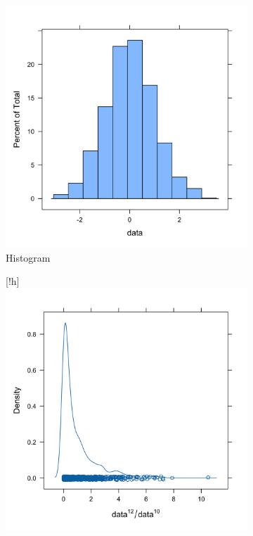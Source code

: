 \documentclass[10pt, a4paper, titlepage]{article}
\begin{document}
\begin{figure}[htbp]
    \centering
    \begin{subfigure}{0.45\textwidth}
        \centering
        \includegraphics[width=\textwidth]{histogram.png}
        \caption{Histogram}
        \label{fig:sub1}
    \end{subfigure}
    \hfill
    \begin{subfigure}{0.45\textwidth}[!h]
        \centering
        \includegraphics[width=\linewidth]{densityplot.png}

\end{subfigure}
\end{figure}
\end{document}
